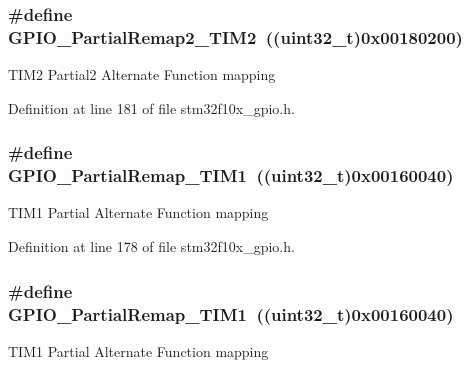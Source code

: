 \subsubsection[{\texorpdfstring{G\+P\+I\+O\+\_\+\+Partial\+Remap2\+\_\+\+T\+I\+M2}{GPIO_PartialRemap2_TIM2}}]{\setlength{\rightskip}{0pt plus 5cm}\#define G\+P\+I\+O\+\_\+\+Partial\+Remap2\+\_\+\+T\+I\+M2~(({\bf uint32\+\_\+t})0x00180200)}\hypertarget{group___g_p_i_o___remap__define_ga42908e73dfc201d0a7b4ab0ed6f15eb7}{}\label{group___g_p_i_o___remap__define_ga42908e73dfc201d0a7b4ab0ed6f15eb7}
T\+I\+M2 Partial2 Alternate Function mapping 

Definition at line 181 of file stm32f10x\+\_\+gpio.\+h.

\subsubsection[{\texorpdfstring{G\+P\+I\+O\+\_\+\+Partial\+Remap\+\_\+\+T\+I\+M1}{GPIO_PartialRemap_TIM1}}]{\setlength{\rightskip}{0pt plus 5cm}\#define G\+P\+I\+O\+\_\+\+Partial\+Remap\+\_\+\+T\+I\+M1~(({\bf uint32\+\_\+t})0x00160040)}\hypertarget{group___g_p_i_o___remap__define_ga0e94344776c53a76f6e9d933139c05a6}{}\label{group___g_p_i_o___remap__define_ga0e94344776c53a76f6e9d933139c05a6}
T\+I\+M1 Partial Alternate Function mapping 

Definition at line 178 of file stm32f10x\+\_\+gpio.\+h.

\subsubsection[{\texorpdfstring{G\+P\+I\+O\+\_\+\+Partial\+Remap\+\_\+\+T\+I\+M1}{GPIO_PartialRemap_TIM1}}]{\setlength{\rightskip}{0pt plus 5cm}\#define G\+P\+I\+O\+\_\+\+Partial\+Remap\+\_\+\+T\+I\+M1~(({\bf uint32\+\_\+t})0x00160040)}\hypertarget{group___g_p_i_o___remap__define_ga0e94344776c53a76f6e9d933139c05a6}{}\label{group___g_p_i_o___remap__define_ga0e94344776c53a76f6e9d933139c05a6}
T\+I\+M1 Partial Alternate Function mapping 

